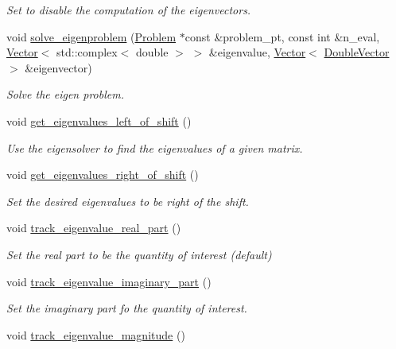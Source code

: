 \begin{DoxyCompactItemize}
\begin{DoxyCompactList}\small\item\em Set to disable the computation of the eigenvectors. \end{DoxyCompactList}\item 
void \hyperlink{classoomph_1_1ARPACK_ac644213623ea3d91a42cf1ea4608cdf3}{solve\+\_\+eigenproblem} (\hyperlink{classoomph_1_1Problem}{Problem} $\ast$const \&problem\+\_\+pt, const int \&n\+\_\+eval, \hyperlink{classoomph_1_1Vector}{Vector}$<$ std\+::complex$<$ double $>$ $>$ \&eigenvalue, \hyperlink{classoomph_1_1Vector}{Vector}$<$ \hyperlink{classoomph_1_1DoubleVector}{Double\+Vector} $>$ \&eigenvector)
\begin{DoxyCompactList}\small\item\em Solve the eigen problem. \end{DoxyCompactList}\item 
void \hyperlink{classoomph_1_1ARPACK_a513c4cadda58eb9a0f1319f8b3159852}{get\+\_\+eigenvalues\+\_\+left\+\_\+of\+\_\+shift} ()
\begin{DoxyCompactList}\small\item\em Use the eigensolver to find the eigenvalues of a given matrix. \end{DoxyCompactList}\item 
void \hyperlink{classoomph_1_1ARPACK_a177485cda9de5e207917adfdd6c6cdbb}{get\+\_\+eigenvalues\+\_\+right\+\_\+of\+\_\+shift} ()
\begin{DoxyCompactList}\small\item\em Set the desired eigenvalues to be right of the shift. \end{DoxyCompactList}\item 
void \hyperlink{classoomph_1_1ARPACK_aa936a369ba1e4fd65e971ba5945ae2d8}{track\+\_\+eigenvalue\+\_\+real\+\_\+part} ()
\begin{DoxyCompactList}\small\item\em Set the real part to be the quantity of interest (default) \end{DoxyCompactList}\item 
void \hyperlink{classoomph_1_1ARPACK_a41e0454599dbf2db541fc66280ea60e3}{track\+\_\+eigenvalue\+\_\+imaginary\+\_\+part} ()
\begin{DoxyCompactList}\small\item\em Set the imaginary part fo the quantity of interest. \end{DoxyCompactList}\item 
void \hyperlink{classoomph_1_1ARPACK_a94e5065868bc3c3187f15e9220314383}{track\+\_\+eigenvalue\+\_\+magnitude} ()

\end{DoxyCompactItemize}
